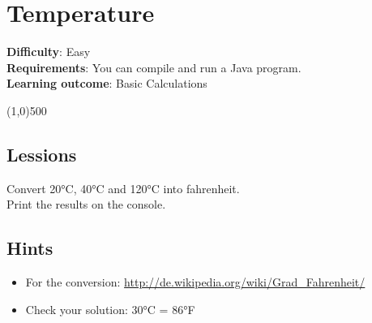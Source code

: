 


\chapter*{Temperature}

\headingfont
\parbox {\textwidth}{
    \textbf{Difficulty}: Easy \\
    \textbf{Requirements}: You can compile and run a Java program. \\
    \textbf{Learning outcome}: Basic Calculations
}
\normalfont
\begin{center}
\line(1,0){500}
\end{center}
\vspace{1cm}

\section*{Lessions}
Convert 20°C, 40°C and 120°C into fahrenheit. \\
Print the results on the console.

\section*{Hints}
\begin{itemize}
     \item For the conversion: 
         \url{http://de.wikipedia.org/wiki/Grad_Fahrenheit/}
     \item Check your solution: 30°C = 86°F
\end{itemize}


